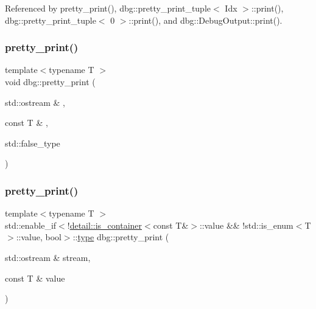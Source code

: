 Referenced by pretty\+\_\+print(), dbg\+::pretty\+\_\+print\+\_\+tuple$<$ Idx $>$\+::print(), dbg\+::pretty\+\_\+print\+\_\+tuple$<$ 0 $>$\+::print(), and dbg\+::\+Debug\+Output\+::print().

\mbox{\label{namespacedbg_ab875770941388a1d8279e9b5257e5a93}} 
\subsubsection{\texorpdfstring{pretty\+\_\+print()}{pretty\_print()}\hspace{0.1cm}{\footnotesize\ttfamily [2/19]}}
{\footnotesize\ttfamily template$<$typename T $>$ \\
void dbg\+::pretty\+\_\+print (\begin{DoxyParamCaption}\item[{std\+::ostream \&}]{,  }\item[{const T \&}]{,  }\item[{std\+::false\+\_\+type}]{ }\end{DoxyParamCaption})\hspace{0.3cm}{\ttfamily [inline]}}

\mbox{\label{namespacedbg_a4920208faa7096e0333f9d14119a9c2f}} 
\subsubsection{\texorpdfstring{pretty\+\_\+print()}{pretty\_print()}\hspace{0.1cm}{\footnotesize\ttfamily [3/19]}}
{\footnotesize\ttfamily template$<$typename T $>$ \\
std\+::enable\+\_\+if$<$!\hyperlink{structdbg_1_1detail_1_1is__container}{detail\+::is\+\_\+container}$<$const T\&$>$\+::value \&\& !std\+::is\+\_\+enum$<$T$>$\+::value, bool$>$\+::\hyperlink{namespacedbg_a2365d80e3a3525e6025040383ff8661b}{type} dbg\+::pretty\+\_\+print (\begin{DoxyParamCaption}\item[{std\+::ostream \&}]{stream,  }\item[{const T \&}]{value }\end{DoxyParamCaption})\hspace{0.3cm}{\ttfamily [inline]}}

